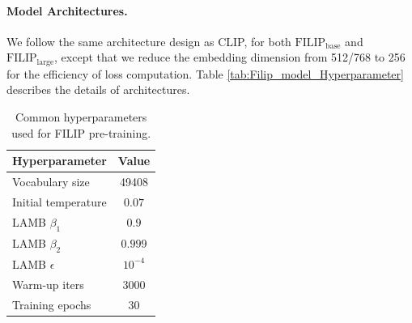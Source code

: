 \paragraph{Model Architectures.} 
We follow the same architecture design as CLIP, for both $\text{FILIP}_{\text{base}}$ and $\text{FILIP}_{\text{large}}$, except that we reduce the embedding dimension from 512/768 to 256 for the efficiency of loss computation.
Table \ref{tab:Filip_model_Hyperparameter} describes the details of architectures.

\begin{table}
    \centering
    \caption{Common hyperparameters used for FILIP pre-training.}
    \label{tab:pre-training hyperparams}
    \centering
     \begin{tabular}{l|c}
        \toprule Hyperparameter & Value \\
        \midrule
        Vocabulary size & 49408 \\
        Initial temperature & $0.07$ \\
        LAMB $\beta_{1}$ & $0.9$ \\
        LAMB $\beta_{2}$ & $0.999$ \\
        LAMB $\epsilon$  & $10^{-4}$ \\
        Warm-up iters & 3000 \\
        Training epochs & 30  \\
        \bottomrule
    \end{tabular}
 
    \end{table}
  
